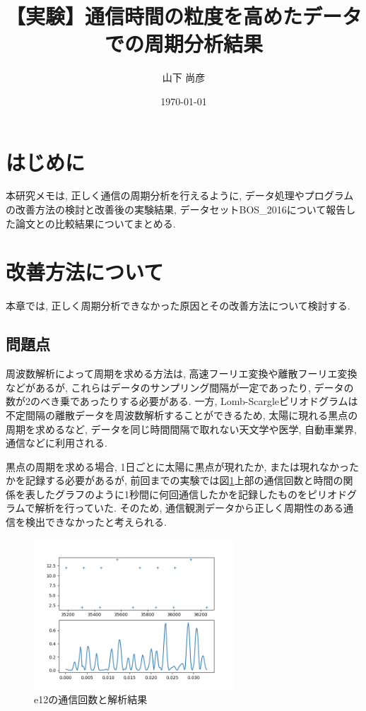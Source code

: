 \documentclass[twocolumn,10pt]{ltjsarticle}
\title{【実験】通信時間の粒度を高めたデータでの周期分析結果}
\author{山下 尚彦}
\date{\today}
\begin{document}
\maketitle

\section{はじめに}
本研究メモは, 正しく通信の周期分析を行えるように, データ処理やプログラムの改善方法の検討と改善後の実験結果, データセットBOS\_2016について報告した論文\cite{weko_175829_1}との比較結果についてまとめる. 

\section{改善方法について}
本章では, 正しく周期分析できなかった原因とその改善方法について検討する.  

\subsection{問題点}
周波数解析によって周期を求める方法は, 高速フーリエ変換や離散フーリエ変換などがあるが, これらはデータのサンプリング間隔が一定であったり, データの数が2のべき乗であったりする必要がある. 一方, Lomb-Scargleピリオドグラムは不定間隔の離散データを周波数解析することができるため, 太陽に現れる黒点の周期を求めるなど, データを同じ時間間隔で取れない天文学や医学, 自動車業界, 通信などに利用される. 

黒点の周期を求める場合, 1日ごとに太陽に黒点が現れたか, または現れなかったかを記録する必要があるが, 前回までの実験では図\ref{fig:e12_result}上部の通信回数と時間の関係を表したグラフのように1秒間に何回通信したかを記録したものをピリオドグラムで解析を行っていた. そのため, 通信観測データから正しく周期性のある通信を検出できなかったと考えられる. 

\begin{figure}[htbp]
    \centering

    \includegraphics[width=7.5cm]{images/【実験】通信時間の粒度を高めたデータでの周期分析結果/e12.png}

    \caption{e12の通信回数と解析結果}
    \label{fig:e12_result}
\end{figure}
\end{document}
